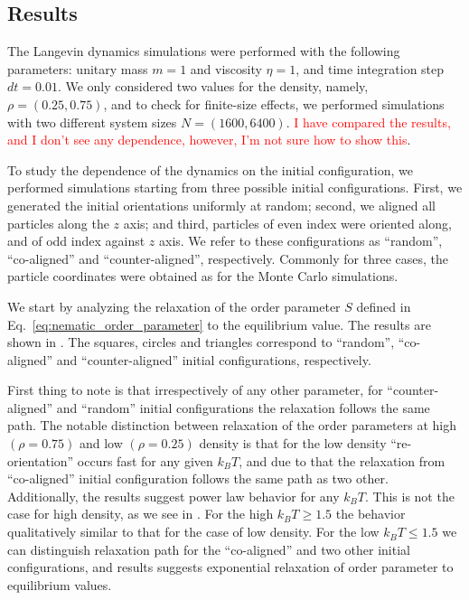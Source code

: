 \subsection{Results}
\label{subsec:molecular_dynamics_results}

The Langevin dynamics simulations were performed with the following parameters: unitary mass $m = 1$ and viscosity $\eta = 1$, and time integration step $d t = 0.01$. We only considered two values for the density, namely, $\rho = (0.25, 0.75)$, and to check for finite-size effects, we performed simulations with two different system sizes $N = (1600, 6400)$. \textcolor{red}{I have compared the results, and I don't see any dependence, however, I'm not sure how to show this}.

To study the dependence of the dynamics on the initial configuration, we performed simulations starting from three possible initial configurations. First, we generated the initial orientations uniformly at random; second,  we aligned all particles along the $z$ axis; and third, particles of even index were oriented along, and of odd index against $z$ axis. We refer to these configurations as ``random'', ``co-aligned'' and ``counter-aligned'', respectively. Commonly for three cases, the particle coordinates were obtained as for the Monte Carlo simulations.

We start by analyzing the relaxation of the order parameter $S$ defined in Eq.~\eqref{eq:nematic_order_parameter} to the equilibrium value. The results are shown in . The squares, circles and triangles correspond to ``random'', ``co-aligned'' and ``counter-aligned'' initial configurations, respectively.

First thing to note is that irrespectively of any other parameter, for ``counter-aligned'' and ``random'' initial configurations the relaxation follows the same path.
The notable distinction between relaxation of the order parameters at high $(\rho = 0.75)$ and low $(\rho = 0.25)$ density is that for the low density ``re-orientation'' occurs fast for any given $k_BT$, and due to that the relaxation from ``co-aligned'' initial configuration follows the same path as two other. Additionally, the results suggest power law behavior for any $k_BT$. This is not the case for high density, as we see in . For the high $k_BT \geq 1.5$ the behavior qualitatively similar to that for the case of low density. For the low $k_BT \le 1.5$ we can distinguish relaxation path for the ``co-aligned'' and two other initial configurations, and results suggests exponential relaxation of order parameter to equilibrium values.

